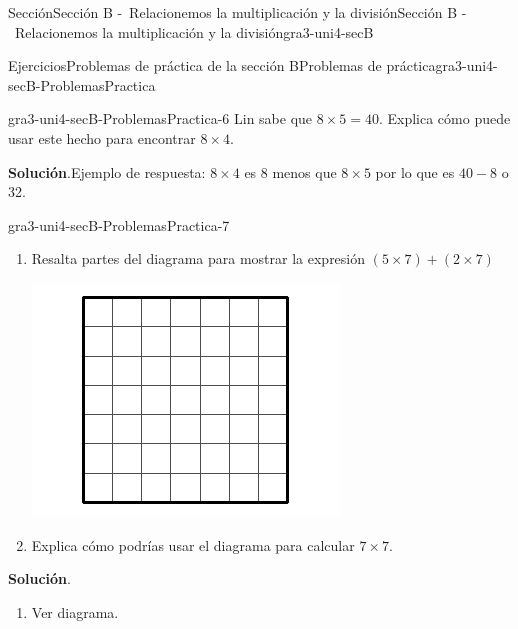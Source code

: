 \documentclass[oneside,10pt,]{article}
\newcommand{\blocktitlefont}{\relax}
\begin{document}
\begin{sectionptx}{Sección}{Sección B -~Relacionemos la multiplicación y la división}{}{Sección B -~Relacionemos la multiplicación y la división}{}{}{gra3-uni4-secB}
\begin{exercises-subsection}{Ejercicios}{Problemas de práctica de la sección B}{}{Problemas de práctica}{}{}{gra3-uni4-secB-ProblemasPractica}
\begin{divisionexercise}{4}{}{}{gra3-uni4-secB-ProblemasPractica-6}%
Lin sabe que \(8 \times 5 = 40\). Explica cómo puede usar este hecho para encontrar \(8 \times 4\).%
\par\smallskip%
\noindent\textbf{\blocktitlefont Solución}.\hypertarget{gra3-uni4-secB-ProblemasPractica-6-2}{}\quad{}Ejemplo de respuesta: \(8 \times 4\) es 8 menos que \(8 \times 5\) por lo que es \(40 - 8\) o 32.%
\end{divisionexercise}%
\begin{divisionexercise}{5}{}{}{gra3-uni4-secB-ProblemasPractica-7}%
%
\begin{enumerate}[label={(\alph*)}]
\item{}Resalta partes del diagrama para mostrar la expresión \((5 \times 7) + (2 \times 7)\)%
\begin{image}{0}{1}{0}{}%
\includegraphics[width=\linewidth]{external/svg-source/tikz-file-151677-scale13.pdf}
\end{image}%
\item{}Explica cómo podrías usar el diagrama para calcular \(7\times 7\).%
\end{enumerate}
\par\smallskip%
\noindent\textbf{\blocktitlefont Solución}.\hypertarget{gra3-uni4-secB-ProblemasPractica-7-2}{}\quad{}\begin{sidebyside}{2}{0}{0}{0}%
\begin{sbspanel}{0.6}%
%
\begin{enumerate}[label={(\alph*)}]
\item{}Ver diagrama.%

\end{enumerate}
\end{sbspanel}
\end{sidebyside}
\end{divisionexercise}
\end{exercises-subsection}
\end{sectionptx}
\end{document}

